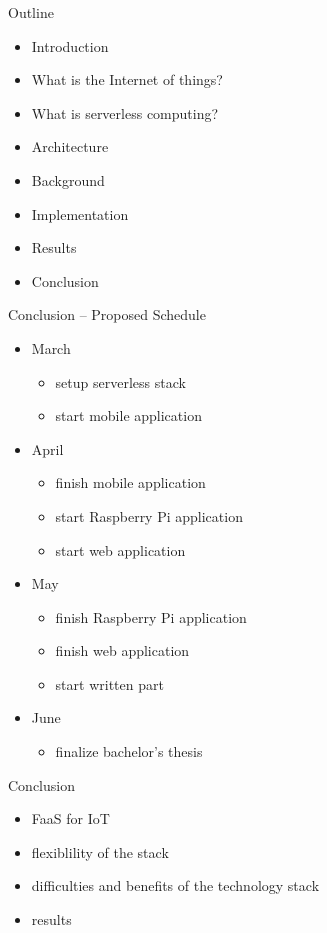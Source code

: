 \documentclass[aspectratio=169]{beamer}
\begin{document}
  \maketitle

  \begin{frame}{Outline}
    \begin{itemize}
      \item Introduction
      \item What is the Internet of things?
      \item What is serverless computing?
      \item Architecture
      \item Background
      \item Implementation
      \item Results
      \item Conclusion
    \end{itemize}
  \end{frame}

  
  
  
  
  

  \begin{frame}{Conclusion -- Proposed Schedule}
    \begin{itemize}
      \item March
        \begin{itemize}
          \item setup serverless stack
          \item start mobile application
        \end{itemize}
      \item April
        \begin{itemize}
          \item finish mobile application
          \item start Raspberry Pi application
          \item start web application
        \end{itemize}
      \item May
        \begin{itemize}
          \item finish Raspberry Pi application
          \item finish web application
          \item start written part
        \end{itemize}
      \item June
        \begin{itemize}
          \item finalize bachelor’s thesis
        \end{itemize}
    \end{itemize}
  \end{frame}

  \begin{frame}{Conclusion}
    \begin{itemize}
      \item FaaS for IoT
      \item flexiblility of the stack
      \item difficulties and benefits of the technology stack
      \item results
    \end{itemize}
  \end{frame}
\end{document}

